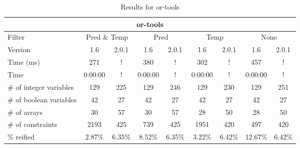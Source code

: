 \documentclass{standalone}
\begin{document}
\begin{table}[H]
\footnotesize
\centering
\begin{tabular}{lc|c|c|c|c|c|c|c}
\multicolumn{9}{c}{or-tools} \\ 
\hline\hline Filter & \multicolumn{2}{c|}{Pred \& Temp} &\multicolumn{2}{c|}{Pred}  & \multicolumn{2}{c|}{Temp} & \multicolumn{2}{c}{None} \\ 
\hline Version & 1.6 & 2.0.1 & 1.6 & 2.0.1 & 1.6 & 2.0.1 & 1.6 & 2.0.1 \\ 
Time (ms)               & 271 & ! & 380 & ! & 302 & ! & 457 & ! \\
Time                    & 0:00:00 & ! & 0:00:00 & ! & 0:00:00 & ! & 0:00:00 & ! \\ 
\# of integer variables & 129 & 225 & 129 & 246 & 129 & 230 & 129 & 251 \\ 
\# of boolean variables & 42 & 27 & 42 & 27 & 42 & 27 & 42 & 27 \\ 
\# of arrays            & 30 & 57 & 30 & 57 & 28 & 50 & 28 & 50 \\ 
\# of constraints       & 2193 & 425 & 739 & 425 & 1951 & 420 & 497 & 420 \\ 
\% reified               & 2.87\% & 6.35\% & 8.52\% & 6.35\% & 3.22\% & 6.42\% & 12.67\% & 6.42\% \\ 
\end{tabular}
\caption{Results for or-tools}\label{tab:res_or}
\end{table}
\end{document}

